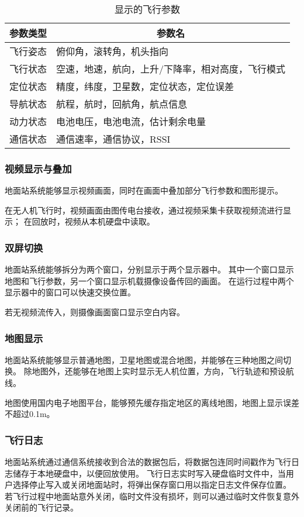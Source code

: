 \begin{table}[ht]
\centering
\caption{显示的飞行参数}
\label{t3dppara}
\begin{tabular}{|l|l|}
\hline
\multicolumn{1}{|c|}{参数类型} & \multicolumn{1}{c|}{参数名}  \\ \hline
飞行姿态 & 俯仰角，滚转角，机头指向              \\ \hline
飞行状态 & 空速，地速，航向，上升/下降率，相对高度，飞行模式 \\ \hline
定位状态 & 精度，纬度，卫星数，定位状态，定位误差       \\ \hline
导航状态 & 航程，航时，回航角，航点信息            \\ \hline
动力状态 & 电池电压，电池电流，估计剩余电量          \\ \hline
通信状态 & 通信速率，通信协议，RSSI            \\ \hline
\end{tabular}
\end{table}

\subsubsection{视频显示与叠加}
地面站系统能够显示视频画面，同时在画面中叠加部分飞行参数和图形提示。

在无人机飞行时，视频画面由图传电台接收，通过视频采集卡获取视频流进行显示；
在回放时，视频从本机硬盘中读取。

\subsubsection{双屏切换}
地面站系统能够拆分为两个窗口，分别显示于两个显示器中。
其中一个窗口显示地图和飞行参数，另一个窗口显示机载摄像设备传回的画面。
在运行过程中两个显示器中的窗口可以快速交换位置。

若无视频流传入，则摄像画面窗口显示空白内容。

\subsubsection{地图显示}
地面站系统能够显示普通地图，卫星地图或混合地图，并能够在三种地图之间切换。
除地图外，还能够在地图上实时显示无人机位置，方向，飞行轨迹和预设航线。

地图使用国内电子地图平台，能够预先缓存指定地区的离线地图，地图上显示误差不超过0.1m。

\subsubsection{飞行日志}
地面站系统通过通信系统接收到合法的数据包后，将数据包连同时间戳作为飞行日志储存于本地硬盘中，以便回放使用。
飞行日志实时写入硬盘临时文件中，当用户选择停止写入或关闭地面站时，将弹出保存窗口用以指定日志文件保存位置。
若飞行过程中地面站意外关闭，临时文件没有损坏，则可以通过临时文件恢复意外关闭前的飞行记录。

